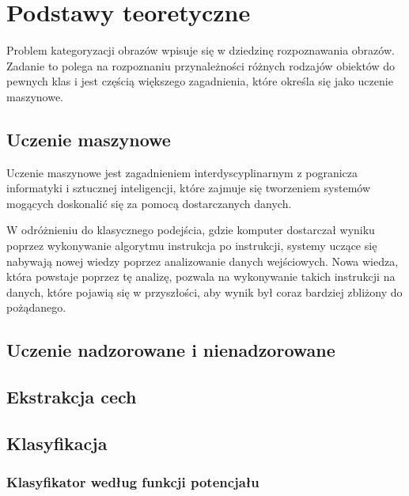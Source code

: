 \chapter{Podstawy teoretyczne}

Problem kategoryzacji obrazów wpisuje się w dziedzinę rozpoznawania obrazów. Zadanie to polega na rozpoznaniu przynależności różnych rodzajów obiektów do pewnych klas\cite{Tad91} i jest częścią większego zagadnienia, które określa się jako uczenie maszynowe.

\section{Uczenie maszynowe}

Uczenie maszynowe jest zagadnieniem interdyscyplinarnym z pogranicza informatyki i sztucznej inteligencji, które zajmuje się tworzeniem systemów mogących doskonalić się za pomocą dostarczanych danych. 

W odróżnieniu do klasycznego podejścia, gdzie komputer dostarczał wyniku poprzez wykonywanie algorytmu instrukcja po instrukcji, systemy uczące się nabywają nowej wiedzy poprzez analizowanie danych wejściowych. Nowa wiedza, która powstaje poprzez tę analizę, pozwala na wykonywanie takich instrukcji na danych, które pojawią się w przyszłości, aby wynik był coraz bardziej zbliżony do pożądanego.

\section{Uczenie nadzorowane i nienadzorowane}


\section{Ekstrakcja cech}

\section{Klasyfikacja}

	\subsection{Klasyfikator według funkcji potencjału}
	
